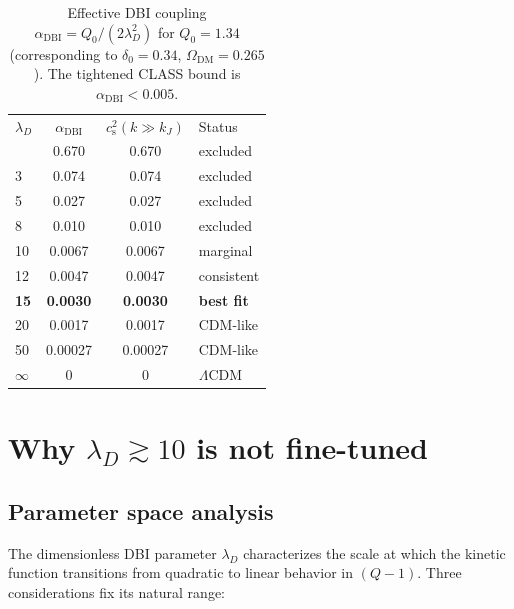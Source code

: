 \documentclass[prd,twocolumn,superscriptaddress,longbibliography,floatfix]{revtex4-2}
\newcommand{\cs}{c_{\mathrm{s}}}
\begin{document}
\begin{table}[b]
\caption{\label{tab:alpha}Effective DBI coupling
$\alpha_{\mathrm{DBI}} = Q_0/(2\lambda_D^2)$ for
$Q_0 = 1.34$ (corresponding to $\delta_0 = 0.34$,
$\Omega_{\mathrm{DM}} = 0.265$).  The tightened CLASS
bound is $\alpha_{\mathrm{DBI}} < 0.005$.}
\begin{ruledtabular}
\begin{tabular}{lccl}
$\lambda_D$ & $\alpha_{\mathrm{DBI}}$ &
$\cs^2(k \gg k_J)$ & Status \\
\colrule
1   & 0.670  & 0.670  & excluded \\
3   & 0.074  & 0.074  & excluded \\
5   & 0.027  & 0.027  & excluded \\
8   & 0.010  & 0.010  & excluded \\
10  & 0.0067 & 0.0067 & marginal \\
12  & 0.0047 & 0.0047 & consistent \\
\textbf{15} & \textbf{0.0030} & \textbf{0.0030} & \textbf{best fit} \\
20  & 0.0017 & 0.0017 & CDM-like \\
50  & 0.00027 & 0.00027 & CDM-like \\
$\infty$ & 0 & 0 & $\Lambda$CDM \\
\end{tabular}
\end{ruledtabular}
\end{table}


\section{Why $\lambda_D \gtrsim 10$ is not fine-tuned}
\label{sec:naturalness}

\subsection{Parameter space analysis}

The dimensionless DBI parameter $\lambda_D$
characterizes the scale at which the kinetic function
transitions from quadratic to linear behavior in
$(Q - 1)$.  Three considerations fix its natural range:
\end{document}

